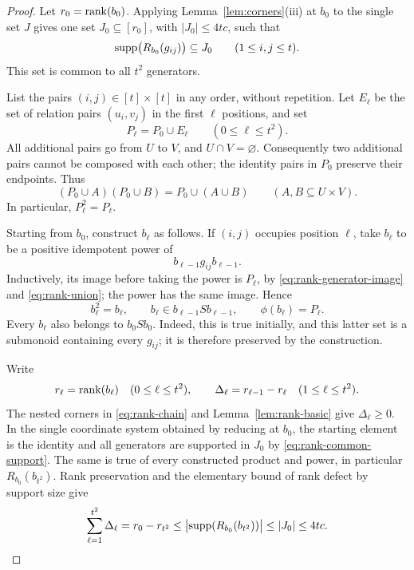 \begin{proof}


Let $r_0=\operatorname{rank}(b_0)$. Applying Lemma~\ref{lem:corners}(iii) at
$b_0$ to the single set $J$ gives one set $J_0\subseteq[r_0]$,
with $|J_0|\le4tc$, such that
\begin{equation}\label{eq:rank-common-support}
 \operatorname{supp}\bigl(R_{b_0}(g_{ij})\bigr)\subseteq J_0
 \qquad(1\le i,j\le t).
\end{equation}
This set is common to all $t^2$ generators.

List the pairs $(i,j)\in[t]\times[t]$ in any order, without
repetition. Let $E_\ell$ be the set of relation pairs $(u_i,v_j)$
in the first $\ell$ positions, and set
\[
 P_\ell=P_0\cup E_\ell\qquad(0\le\ell\le t^2).
\]
All additional pairs go from $U$ to $V$, and $U\cap V=\varnothing$.
Consequently two additional pairs cannot be composed with each other;
the identity pairs in $P_0$ preserve their endpoints. Thus
\begin{equation}\label{eq:rank-union}
 (P_0\cup A)(P_0\cup B)=P_0\cup(A\cup B)
 \qquad(A,B\subseteq U\times V).
\end{equation}
In particular, $P_\ell^2=P_\ell$.

Starting from $b_0$, construct $b_\ell$ as follows. If $(i,j)$ occupies
position $\ell$, take $b_\ell$ to be a positive idempotent power of
\[
 b_{\ell-1}g_{ij}b_{\ell-1}.
\]
Inductively, its image before taking the power is $P_\ell$, by
\eqref{eq:rank-generator-image} and \eqref{eq:rank-union};
the power has the same image. Hence
\begin{equation}\label{eq:rank-chain}
 b_\ell^2=b_\ell,\qquad
 b_\ell\in b_{\ell-1}Sb_{\ell-1},\qquad
 \phi(b_\ell)=P_\ell.
\end{equation}
Every $b_\ell$ also belongs to $b_0Sb_0$. Indeed, this is true
initially, and this latter set is a submonoid containing every $g_{ij}$;
it is therefore preserved by the construction.

Write
\[
 r_\ell=\operatorname{rank}(b_\ell)\quad(0\le\ell\le t^2),
 \qquad
 \Delta_\ell=r_{\ell-1}-r_\ell\quad(1\le\ell\le t^2).
\]
The nested corners in \eqref{eq:rank-chain} and
Lemma~\ref{lem:rank-basic} give $\Delta_\ell\ge0$.
In the single coordinate system obtained
by reducing at $b_0$, the starting element is the identity and all
generators are supported in $J_0$ by \eqref{eq:rank-common-support}.
The same is true of every constructed product and power, in particular
$R_{b_0}(b_{t^2})$. Rank preservation and the elementary bound of rank
defect by support size give
\begin{equation}\label{eq:rank-total-budget}
 \sum_{\ell=1}^{t^2}\Delta_\ell
 =r_0-r_{t^2}
 \le\bigl|\operatorname{supp}(R_{b_0}(b_{t^2}))\bigr|
 \le|J_0|\le4tc.
\end{equation}


\end{proof}
